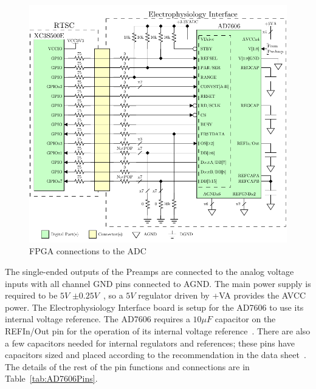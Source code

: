 \begin{figure}[H]
	\centering 
		\includegraphics{./figures/AD} 
	\caption{FPGA connections to the ADC\label{fig:ADC}}
\end{figure}

The single-ended outputs of the Preamps are connected to the analog voltage inputs with all channel GND pins connected to AGND.  The main power supply is required to be $5\unit{V}$ $\pm 0.25\unit{V}$~\cite{AD7606ds}, so a $5\unit{V}$ regulator driven by +VA provides the AVCC power.  The Electrophysiology Interface board is setup for the AD7606 to use its internal voltage reference.  The AD7606 requires a $10\unit{\mu F}$ capacitor on the REFIn/Out pin for the operation of its internal voltage reference~\cite{AD7606ds}.  There are also a few capacitors needed for internal regulators and references; these pins have capacitors sized and placed according to the recommendation in the data sheet~\cite{AD7606ds}.  The details of the rest of the pin functions and connections are in Table~\ref{tab:AD7606Pins}.

